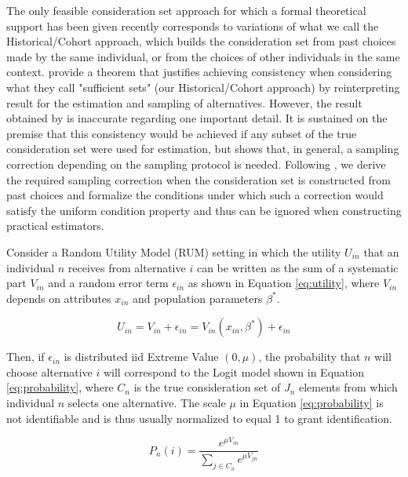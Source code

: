 \documentclass[12pt,a4paper]{article}
\begin{document}
The only feasible consideration set approach for which a formal theoretical support has been given recently corresponds to variations of what we call the Historical/Cohort approach, which builds the consideration set from past choices made by the same individual, or from the choices of other individuals in the same context.\cite{crawford2021survey} provide a theorem that justifies achieving consistency when considering what they call "sufficient sets" (our Historical/Cohort approach) by reinterpreting \cite{mcfadden1978} result for the estimation and sampling of alternatives. However, the result obtained by \cite{crawford2021survey} is inaccurate regarding one important detail. It is sustained on the premise that this consistency would be achieved if any subset of the true consideration set were used for estimation, but \cite{mcfadden1978} shows that, in general, a sampling correction depending on the sampling protocol is needed. Following \cite{angelonote}, we derive the required sampling correction when the consideration set is constructed from past choices and formalize the conditions under which such a correction would satisfy the uniform condition property and thus can be ignored when constructing practical estimators.

Consider a Random Utility Model (RUM) setting in which the utility $U_{in}$ that an individual $n$ receives from alternative $i$ can be written as the sum of a systematic part $V_{in}$ and a random error term $\epsilon_{in}$ as shown in Equation \ref{eq:utility}, where $V_{in}$ depends on attributes $x_{in}$ and population parameters $\beta^{*}$.

\begin{equation} \label{eq:utility}
U_{in} = V_{in} + \epsilon_{in} =  V_{in}(x_{in}, \beta^{*}) + \epsilon_{in}
\end{equation}

Then, if $\epsilon_{in}$ is distributed iid Extreme Value $(0,\mu)$, the probability that $n$ will choose alternative $i$ will correspond to the Logit model shown in Equation \ref{eq:probability}, where $C_{n}$ is the true consideration set of $J_{n}$ elements from which individual $n$ selects one alternative. The scale $\mu$ in Equation \ref{eq:probability} is not identifiable and is thus usually normalized to equal 1 to grant identification.

\begin{equation} \label{eq:probability}
P_{n}(i) = \frac{e^{\mu V_{in}}}{\sum_{j \in C_{n}}{e^{\mu V_{jn}}}} 
\end{equation}
\end{document}
